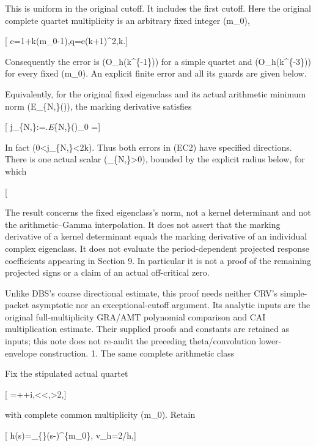 This is uniform in the original cutoff. It includes the first cutoff. Here the original complete quartet multiplicity is an arbitrary fixed integer (m\_0),

{[} e=1+k(m\_0-1),\qquad q=e(k+1)\^{}2,\qquad k.{]}

Consequently the error is (O\_h(k\^{}\{-1\})) for a simple quartet and (O\_h(k\^{}\{-3\})) for every fixed (m\_0). An explicit finite error and all its guards are given below.

Equivalently, for the original fixed eigenclass and its actual arithmetic minimum norm (E\_\{N,\rho\}(\theta)), the marking derivative satisfies

{[} j\_\{N,\rho\}:=\left.\partial\emph{\theta\log E}\{N,\rho\}(\theta)\right\textbar\_0 ={]}

In fact (0\textless j\_\{N,\rho\}\textless2k\gamma). Thus both errors in (EC2) have specified directions. There is one actual scalar (\varepsilon\_\{N,\rho\}\textgreater0), bounded by the explicit radius below, for which

{[}  \tag{EC3}{]}

The result concerns the fixed eigenclass's norm, not a kernel determinant and not the arithmetic--Gamma interpolation. It does not assert that the marking derivative of a kernel determinant equals the marking derivative of an individual complex eigenclass. It does not evaluate the period-dependent projected response coefficients appearing in Section 9. In particular it is not a proof of the remaining projected signs or a claim of an actual off-critical zero.

Unlike DBS's coarse directional estimate, this proof needs neither CRV's simple-packet asymptotic nor an exceptional-cutoff argument. Its analytic inputs are the original full-multiplicity GRA/AMT polynomial comparison and CAI multiplication estimate. Their supplied proofs and constants are retained as inputs; this note does not re-audit the preceding theta/convolution lower-envelope construction. 1. The same complete arithmetic class

Fix the stipulated actual quartet

{[} \rho=+\delta+i\gamma,\textless{}\delta\textless{},\quad\gamma\textgreater2,{]}

with complete common multiplicity (m\_0). Retain

{[} h(s)=\prod\_\{\alpha{}\}(s-\alpha)\^{}\{m\_0\}, \qquad v\_h=2\xi/h,{]}

